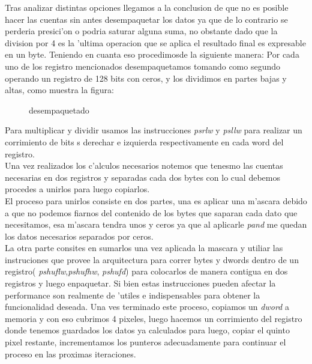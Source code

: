 Tras analizar distintas opciones llegamos a la conclusion de
que no es posible  hacer las cuentas sin antes desempaquetar los datos ya que de lo contrario se perderia
presici'on o  podria saturar alguna suma, no obstante dado que la division por 4 es la 'ultima operacion que se
aplica el resultado final es expresable en un byte. Teniendo en cuanta eso procedimosde la siguiente manera: 
Por cada uno de los registro mencionados desempaquetamos tomando como segundo operando un registro de 128
bits con ceros, y los dividimos en partes bajas y altas, como muestra la figura: \\
\begin{figure}[hb]
\caption{desempaquetado}
\label{est:m-uno}
\end{figure}
Para multiplicar y dividir usamos las instrucciones \textit{psrlw} y \textit{psllw} para realizar un corrimiento 
de bits s derechar e izquierda respectivamente en cada word del registro. \\
Una vez realizados los c'alculos necesarios notemos que tenesmo las cuentas necesarias en dos registros
y separadas cada dos bytes con lo cual debemos procedes a unirlos para luego copiarlos. \\
El proceso para unirlos consiste en dos partes, una es aplicar una m'ascara debido a que no podemos 
fiarnos del contenido de los bytes que saparan cada dato que necesitamos, esa m'ascara tendra unos 
y ceros ya que al aplicarle \textit{pand} me quedan los datos necesarios separados por ceros.\\
La otra parte consites en sumarlos una vez aplicada la mascara y utiliar las instruciones que provee
la arquitectura para correr bytes y dwords dentro de un registro( \textit{pshuflw},\textit{pshufhw},
\textit{pshufd}) para colocarlos de manera contigua en dos registros y luego enpaquetar. Si bien 
estas instrucciones pueden afectar la performance son realmente de 'utiles e
indispensables para obtener la funcionalidad deseada.
Una ves terminado este proceso, copiamos un \textit{dword} a memoria y con eso cubrimos 4 pixeles,
luego hacemos un corrimiento del registro donde tenemos guardados los datos ya calculados para luego,
copiar el quinto pixel restante, incrementamos los punteros adecuadamente para continuar el 
proceso en las proximas iteraciones.\\


